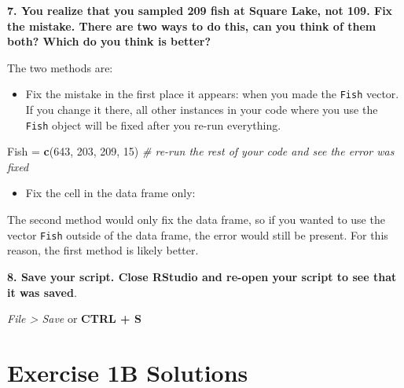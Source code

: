 \documentclass[]{book}
\newenvironment{Shaded}{\begin{snugshade}}{\end{snugshade}}
\newcommand{\KeywordTok}[1]{\textcolor[rgb]{0.13,0.29,0.53}{\textbf{#1}}}
\newcommand{\DecValTok}[1]{\textcolor[rgb]{0.00,0.00,0.81}{#1}}
\newcommand{\StringTok}[1]{\textcolor[rgb]{0.31,0.60,0.02}{#1}}
\newcommand{\CommentTok}[1]{\textcolor[rgb]{0.56,0.35,0.01}{\textit{#1}}}
\newcommand{\OperatorTok}[1]{\textcolor[rgb]{0.81,0.36,0.00}{\textbf{#1}}}
\newcommand{\NormalTok}[1]{#1}
\providecommand{\tightlist}{%
  \setlength{\itemsep}{0pt}\setlength{\parskip}{0pt}}
\theoremstyle{definition}
\theoremstyle{definition}
\theoremstyle{definition}
\theoremstyle{remark}
\begin{document}
\textbf{7. You realize that you sampled 209 fish at Square Lake, not
109. Fix the mistake. There are two ways to do this, can you think of
them both? Which do you think is better?}

The two methods are:

\begin{itemize}
\tightlist
\item
  Fix the mistake in the first place it appears: when you made the
  \texttt{Fish} vector. If you change it there, all other instances in
  your code where you use the \texttt{Fish} object will be fixed after
  you re-run everything.
\end{itemize}

\begin{Shaded}
\begin{Highlighting}[]
\NormalTok{Fish =}\StringTok{ }\KeywordTok{c}\NormalTok{(}\DecValTok{643}\NormalTok{, }\DecValTok{203}\NormalTok{, }\DecValTok{209}\NormalTok{, }\DecValTok{15}\NormalTok{)}
\CommentTok{# re-run the rest of your code and see the error was fixed}
\end{Highlighting}
\end{Shaded}

\begin{itemize}
\tightlist
\item
  Fix the cell in the data frame only:
\end{itemize}

\begin{Shaded}
\end{Shaded}

The second method would only fix the data frame, so if you wanted to use
the vector \texttt{Fish} outside of the data frame, the error would
still be present. For this reason, the first method is likely better.

\textbf{8. Save your script. Close RStudio and re-open your script to
see that it was saved}.

\emph{File \textgreater{} Save} or \textbf{CTRL + S}

\hypertarget{ex1b-answers}{\section*{Exercise 1B
Solutions}\label{ex1b-answers}}
\end{document}
